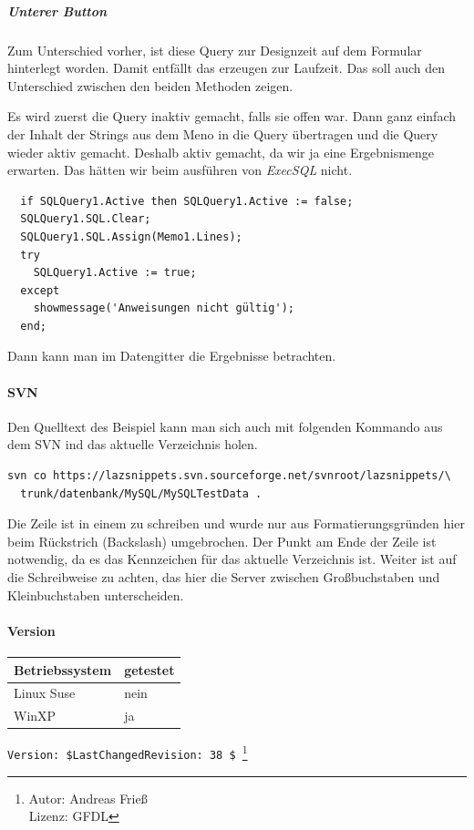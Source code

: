 \subparagraph{Unterer Button}
Zum Unterschied vorher, ist diese Query zur Designzeit auf dem Formular hinterlegt worden. Damit entfällt das erzeugen zur Laufzeit. Das soll auch den Unterschied zwischen den beiden Methoden zeigen.

Es wird zuerst die Query inaktiv gemacht, falls sie offen war. Dann ganz einfach der Inhalt der Strings aus dem Meno in die Query übertragen und die Query wieder aktiv gemacht. Deshalb aktiv gemacht, da wir ja eine Ergebnismenge erwarten. Das hätten wir beim ausführen von \emph{ExecSQL} nicht.
\begin{verbatim}
  if SQLQuery1.Active then SQLQuery1.Active := false;
  SQLQuery1.SQL.Clear;
  SQLQuery1.SQL.Assign(Memo1.Lines);
  try
    SQLQuery1.Active := true;
  except
    showmessage('Anweisungen nicht gültig');
  end;
\end{verbatim}
Dann kann man im Datengitter die Ergebnisse betrachten.


\paragraph{SVN}
Den Quelltext des Beispiel kann man sich auch mit folgenden Kommando aus dem SVN ind das aktuelle Verzeichnis holen.
\begin{verbatim}
svn co https://lazsnippets.svn.sourceforge.net/svnroot/lazsnippets/\
  trunk/datenbank/MySQL/MySQLTestData .
\end{verbatim}
Die Zeile ist in einem zu schreiben und wurde nur aus Formatierungsgründen hier beim Rückstrich (Backslash) umgebrochen. Der Punkt am Ende der Zeile ist notwendig, da es das Kennzeichen für das aktuelle Verzeichnis ist. Weiter ist auf die Schreibweise zu achten, das hier die Server zwischen Großbuchstaben und Kleinbuchstaben unterscheiden.

\paragraph{Version}
\begin{table}[htbp]
		\begin{tabular}[ht]{|l|l|}
      \hline
      Betriebssystem & getestet \\
      \hline
      Linux Suse & nein \\
      WinXP & ja \\
      \hline
		\end{tabular}
\end{table}
\caption{Versionsübersicht}
\label{tab:MySQLTestDataVersion01} 

\verb|Version: $LastChangedRevision: 38 $ |\footnote{ Autor: Andreas Frieß\\Lizenz: GFDL}